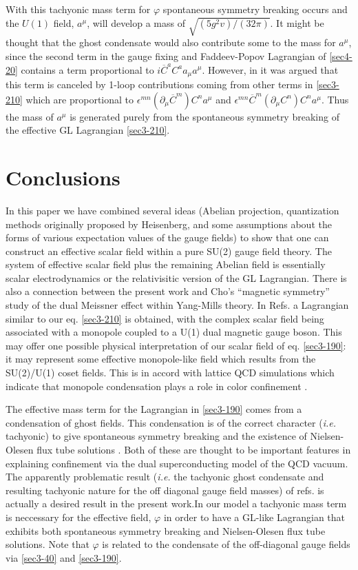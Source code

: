 \documentclass[a4paper,aps,showpacs]{revtex4}
\begin{document}
With this tachyonic mass term for $\varphi$ spontaneous symmetry
breaking occurs and the $U(1)$ field, $a^{\mu}$, will develop a mass of $\sqrt{ (5g^2 v)/(32 \pi )}$.
It might be thought that the ghost condensate would also contribute some to the mass
for $a^{\mu}$, since the second term in the gauge fixing and Faddeev-Popov Lagrangian
of \eqref{sec4-20} contains a term proportional to $i {\overline{ C}}^a C^a a_{\mu} a^{\mu}$.
However, in \cite{dudal} it was argued that this term is canceled by 1-loop contributions
coming from other terms in \eqref{sec3-210} which are proportional to $\epsilon ^{mn}
\left( \partial _{\mu} {\overline{ C}} ^m \right) C^n a^{\mu}$ and $\epsilon ^{mn}
{\overline{ C}} ^m \left( \partial _{\mu} C^n \right) C^n a^{\mu}$. Thus the mass of $a^{\mu}$
is generated purely from the spontaneous symmetry breaking of the effective GL
Lagrangian \eqref{sec3-210}. 

\section{Conclusions}

In this paper we have combined several ideas (Abelian projection, quantization 
methods originally proposed by Heisenberg, and some assumptions about the
forms of various expectation values of the gauge fields) to show that
one can construct an effective scalar field within a pure SU(2) gauge field 
theory. The system of effective scalar field plus the remaining Abelian 
field is essentially scalar electrodynamics or the relativisitic version
of the GL Lagrangian. There is also a
connection between the present work and Cho's \cite{cho} ``magnetic
symmetry'' study of the dual Meissner effect within Yang-Mills theory.
In Refs. \cite{cho} a Lagrangian similar to our eq. \eqref{sec3-210}
is obtained, with the complex scalar field being associated with a monopole
coupled to a U(1) dual magnetic gauge boson. This may offer one possible
physical interpretation of our scalar field of eq. \eqref{sec3-190}:
it may represent some effective monopole-like field which results from
the SU(2)/U(1) coset fields. This is in accord with lattice QCD simulations
which indicate that monopole condensation plays a role in
color confinement \cite{kron}.  

The effective mass term for the Lagrangian in \eqref{sec3-190} comes from
a condensation of ghost fields. This condensation is of the correct character
({\it i.e.} tachyonic) to give spontaneous
symmetry breaking and the existence of Nielsen-Olesen flux tube solutions 
\cite{no}. Both of these are thought to be important features in 
explaining confinement via the dual superconducting model of the QCD vacuum.
The apparently problematic result ({\it i.e.} the tachyonic ghost condensate and
resulting tachyonic nature for the off diagonal gauge field masses)
of refs. \cite{dudal} \cite{lemes} is actually a desired result in the
present work.In our model a tachyonic mass
term is neccessary for the effective field, $\varphi$ in order to have
a GL-like Lagrangian that exhibits both spontaneous symmetry breaking and
Nielsen-Olesen flux tube solutions. Note that 
$\varphi$ is related to the condensate of the off-diagonal gauge fields
via \eqref{sec3-40} and \eqref{sec3-190}. 
\end{document}
